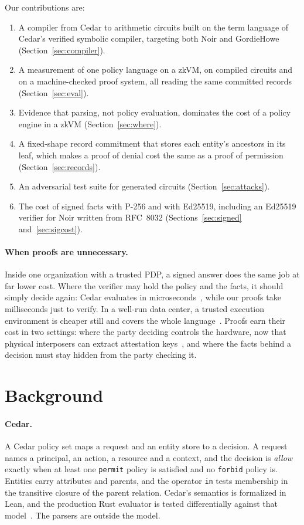 \documentclass[11pt]{article}
\begin{document}
Our contributions are:
\begin{enumerate}
\item A compiler from Cedar to arithmetic circuits built on the term language of Cedar's verified symbolic compiler, targeting both Noir and GordieHowe (Section~\ref{sec:compiler}).
\item A measurement of one policy language on a zkVM, on compiled circuits and on a machine-checked proof system, all reading the same committed records (Section~\ref{sec:eval}).
\item Evidence that parsing, not policy evaluation, dominates the cost of a policy engine in a zkVM (Section~\ref{sec:where}).
\item A fixed-shape record commitment that stores each entity's ancestors in its leaf, which makes a proof of denial cost the same as a proof of permission (Section~\ref{sec:records}).
\item An adversarial test suite for generated circuits (Section~\ref{sec:attacks}).
\item The cost of signed facts with P-256 and with Ed25519, including an Ed25519 verifier for Noir written from RFC~8032 (Sections~\ref{sec:signed} and~\ref{sec:sigcost}).
\end{enumerate}

\paragraph{When proofs are unnecessary.} Inside one organization with a trusted PDP, a signed answer does the same job at far lower cost. Where the verifier may hold the policy and the facts, it should simply decide again: Cedar evaluates in microseconds~\citep{cutler2024cedar}, while our proofs take milliseconds just to verify. In a well-run data center, a trusted execution environment is cheaper still and covers the whole language~\citep{jin2026guardrail}. Proofs earn their cost in two settings: where the party deciding controls the hardware, now that physical interposers can extract attestation keys~\citep{chuang2026teefail}, and where the facts behind a decision must stay hidden from the party checking it.

\section{Background}

\paragraph{Cedar.} A Cedar policy set maps a request and an entity store to a decision. A request names a principal, an action, a resource and a context, and the decision is \emph{allow} exactly when at least one \texttt{permit} policy is satisfied and no \texttt{forbid} policy is. Entities carry attributes and parents, and the operator \texttt{in} tests membership in the transitive closure of the parent relation. Cedar's semantics is formalized in Lean, and the production Rust evaluator is tested differentially against that model~\citep{disselkoen2024vgd}. The parsers are outside the model.
\end{document}
